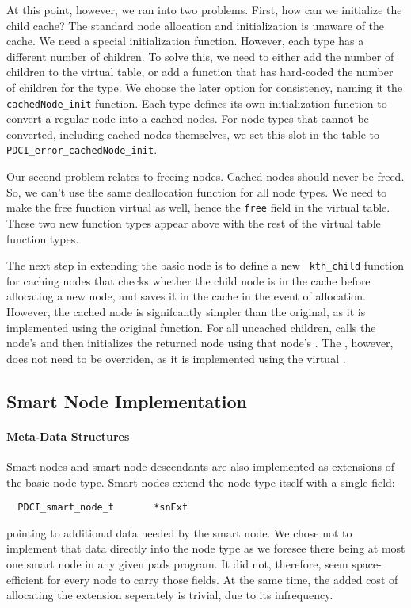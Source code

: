 \documentclass{article}
\begin{document}
At this point, however, we ran into two problems. First, how can we
initialize the child cache? The standard node allocation and
initialization is unaware of the cache. We need a special
initialization function. However, each type has a different number of
children. To solve this, we need to either add the number of children
to the virtual table, or add a function that has hard-coded the number
of children for the type. We choose the later option for consistency,
naming it the {\tt cachedNode\_init} function. Each type defines its
own initialization function to convert a regular node into a cached
nodes. For node types that cannot be converted, including cached nodes
themselves, we set this slot in the table to {\tt
PDCI\_error\_cachedNode\_init}.

Our second problem relates to freeing nodes. Cached nodes should never
be freed. So, we can't use the same deallocation function for all node
types. We need to make the free function virtual as well, hence the
{\tt free} field in the virtual table. These two new function types
appear above with the rest of the virtual table function types.

The next step in extending the basic node is to define a new {\tt
  kth\_child} function for caching nodes that checks whether the child
node is in the cache before allocating a new node, and saves it in the
cache in the event of allocation. However, the cached node \kcfun is
signifcantly simpler than the original, as it is implemented using the
original function. For all uncached children, \cnkc calls the node's
\kcfun and then initializes the returned node using that node's
\cninitfun.  The \kcnfun, however, does not need to be overriden, as
it is implemented using the virtual \kcfun.


\subsection{Smart Node Implementation}
\label{sec:sn-details}


\paragraph{Meta-Data Structures}

Smart nodes and smart-node-descendants are also implemented as
extensions of the basic node type. Smart nodes extend the node type
itself with a single field:
\begin{verbatim}
  PDCI_smart_node_t       *snExt    
\end{verbatim}
pointing to additional data needed by the smart node. We chose not to
implement that data directly into the node type as we foresee there being at
most one smart node in any given pads program. It did not, therefore,
seem space-efficient for every node to carry those fields. At the same
time, the added cost of allocating the extension seperately is
trivial, due to its infrequency.
\end{document}

